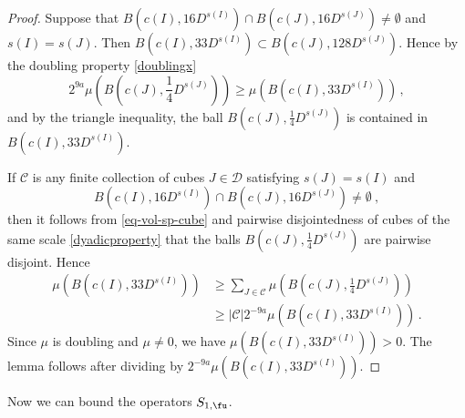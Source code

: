\begin{proof}
    \leanok
    Suppose that $B(c(I), 16 D^{s(I)}) \cap B(c(J), 16 D^{s(J)}) \ne \emptyset$ and $s(I) = s(J)$. Then $B(c(I), 33 D^{s(I)}) \subset B(c(J), 128 D^{s(J)})$. Hence by the doubling property \eqref{doublingx}
    $$
        2^{9a}\mu(B(c(J), \frac{1}{4}D^{s(J)})) \ge \mu(B(c(I), 33 D^{s(I)}))\,,
    $$
    and by the triangle inequality, the ball $B(c(J), \frac{1}{4}D^{s(J)})$ is contained in $B(c(I), 33 D^{s(I)})$.

    If $\mathcal{C}$ is any finite collection of cubes $J \in \mathcal{D}$ satisfying $s(J) = s(I)$ and
    \begin{equation*}
        B(c(I), 16 D^{s(I)}) \cap B(c(J), 16 D^{s(J)}) \ne\emptyset\ ,
    \end{equation*} then it follows from \eqref{eq-vol-sp-cube} and pairwise disjointedness of cubes of the same scale \eqref{dyadicproperty} that the balls $B(c(J), \frac{1}{4} D^{s(J)})$ are pairwise disjoint. Hence
    \begin{align*}
        \mu(B(c(I), 33 D^{s(I)})) &\ge \sum_{J \in \mathcal{C}} \mu(B(c(J), \frac{1}{4}D^{s(J)}))\\
        &\ge |\mathcal{C}| 2^{-9a} \mu(B(c(I), 33 D^{s(I)}))\,.
    \end{align*}
    Since $\mu$ is doubling and $\mu \ne 0$, we have $\mu(B(c(I), 33D^{s(I)})) > 0$. The lemma follows after dividing by $2^{-9a}\mu(B(c(I), 33D^{s(I)}))$.
\end{proof}

Now we can bound the operators $S_{1, \fu}$.

